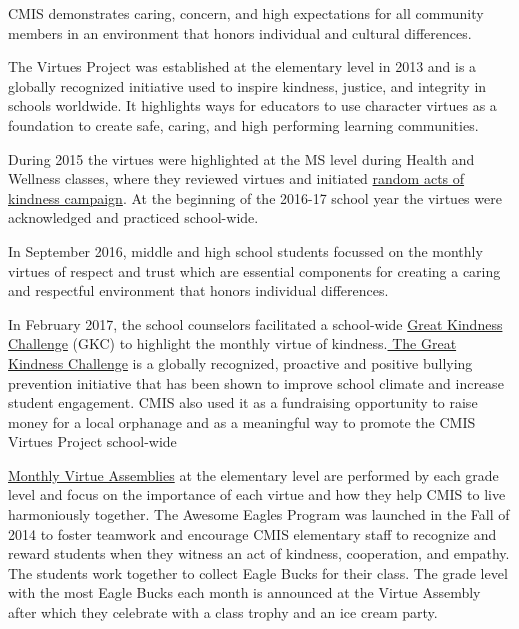 \begin{findings}
CMIS demonstrates caring, concern, and high expectations for all community members in an environment that honors individual and cultural differences.

The Virtues Project was established at the elementary level in 2013 and is a globally recognized initiative used to inspire kindness, justice, and integrity in schools worldwide. It highlights ways for educators to use character virtues as a foundation to create safe, caring, and high performing learning communities. 

During 2015 the virtues were highlighted at the MS level during Health and Wellness classes, where they reviewed virtues and initiated \href{https://docs.google.com/forms/d/e/1FAIpQLScP9Fpphz10qaY0S4RO3VLKBQ54RC3WQdP-FGIBbPOcXzMwpQ/viewform?c=0&w=1}{random acts of kindness campaign}. At the beginning of the 2016-17 school year the virtues were acknowledged and practiced school-wide.


In September 2016, middle and high school students focussed on the monthly virtues of respect  and trust  which are essential  components for creating a caring and respectful environment that honors individual differences.

In February 2017, the school counselors facilitated a school-wide \href{https://docs.google.com/a/cmis.ac.th/document/d/1PsHRple71FshloSGrqvYHgQQCYx9_CwCsbtlMAkb-Aw/edit?usp=sharing}{Great Kindness Challenge} (GKC) to highlight the monthly virtue of kindness.\href{https://dochub.com/roneldanelcapadona/gDPKV2/gkc?dt=ysuio255qfhtbryf}{ The Great Kindness Challenge} is a globally recognized, proactive and positive bullying prevention initiative that has been shown to improve school climate and increase student engagement. CMIS also used it as a fundraising opportunity to raise money for a local orphanage and as a meaningful way to promote the CMIS Virtues Project school-wide

\href{https://docs.google.com/a/cmis.ac.th/document/d/1Mv1xjTpbY36naur8SDt9GanKNfR7YtYVL-bWwGLPSHo/edit?usp=sharing}{Monthly Virtue Assemblies} at the elementary level are performed by each grade level and focus on the importance of each virtue and how they help CMIS to live harmoniously together. The Awesome Eagles Program was launched in the Fall of 2014 to foster teamwork and encourage CMIS elementary staff to recognize and reward students when they witness an act of kindness, cooperation, and empathy. The students work together to collect Eagle Bucks for their class. The grade level with the most Eagle  Bucks each month is announced at the Virtue Assembly after which they celebrate with a class trophy and an ice cream party.


\end{findings}
